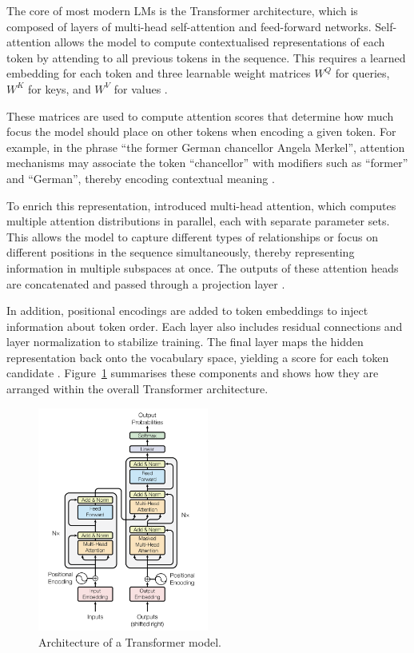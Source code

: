\documentclass[a4paper,oneside,bibliography=totoc]{scrbook}
\begin{document}
The core of most modern \acp{LM} is the Transformer architecture, which is composed of layers of multi-head self-attention and feed-forward networks. Self-attention allows the model to compute contextualised representations of each token by attending to all previous tokens in the sequence. This requires a learned embedding for each token and three learnable weight matrices $W^Q$ for queries, $W^K$ for keys, and $W^V$ for values \cite{Vaswani2023}.

These matrices are used to compute attention scores that determine how much focus the model should place on other tokens when encoding a given token. For example, in the phrase \enquote{the former German chancellor Angela Merkel}, attention mechanisms may associate the token \enquote{chancellor} with modifiers such as \enquote{former} and \enquote{German}, thereby encoding contextual meaning \cite{Sanderson2024}.

To enrich this representation, \citet{Vaswani2023} introduced multi-head attention, which computes multiple attention distributions in parallel, each with separate parameter sets. This allows the model to capture different types of relationships or focus on different positions in the sequence simultaneously, thereby representing information in multiple subspaces at once. The outputs of these attention heads are concatenated and passed through a projection layer \cite{Vaswani2023}.

In addition, positional encodings are added to token embeddings to inject information about token order. Each layer also includes residual connections and layer normalization to stabilize training. The final layer maps the hidden representation back onto the vocabulary space, yielding a score for each token candidate \cite{Vaswani2023}. Figure~\ref{fig:transformer} summarises these components and shows how they are arranged within the overall Transformer architecture.

\begin{figure}[t]
  \centering
  \includegraphics[width=0.5\textwidth]{figures/Transformer.png}
  \caption[Architecture of a Transformer model]{Architecture of a Transformer model. \cite{Vaswani2023}}
  \label{fig:transformer}
\end{figure}
\end{document}
